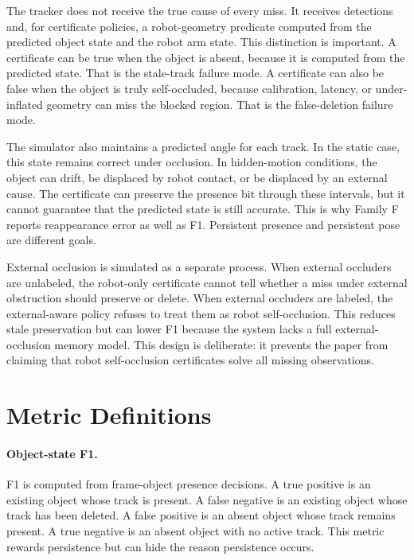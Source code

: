 \documentclass{article}
\begin{document}
The tracker does not receive the true cause of every miss. It receives
detections and, for certificate policies, a robot-geometry predicate computed
from the predicted object state and the robot arm state. This distinction is
important. A certificate can be true when the object is absent, because it is
computed from the predicted state. That is the stale-track failure mode. A
certificate can also be false when the object is truly self-occluded, because
calibration, latency, or under-inflated geometry can miss the blocked region.
That is the false-deletion failure mode.

The simulator also maintains a predicted angle for each track. In the static
case, this state remains correct under occlusion. In hidden-motion conditions,
the object can drift, be displaced by robot contact, or be displaced by an
external cause. The certificate can preserve the presence bit through these
intervals, but it cannot guarantee that the predicted state is still accurate.
This is why Family F reports reappearance error as well as F1. Persistent
presence and persistent pose are different goals.

External occlusion is simulated as a separate process. When external occluders
are unlabeled, the robot-only certificate cannot tell whether a miss under
external obstruction should preserve or delete. When external occluders are
labeled, the external-aware policy refuses to treat them as robot
self-occlusion. This reduces stale preservation but can lower F1 because the
system lacks a full external-occlusion memory model. This design is deliberate:
it prevents the paper from claiming that robot self-occlusion certificates solve
all missing observations.

\section{Metric Definitions}

\paragraph{Object-state F1.}
F1 is computed from frame-object presence decisions. A true positive is an
existing object whose track is present. A false negative is an existing object
whose track has been deleted. A false positive is an absent object whose track
remains present. A true negative is an absent object with no active track. This
metric rewards persistence but can hide the reason persistence occurs.
\end{document}
